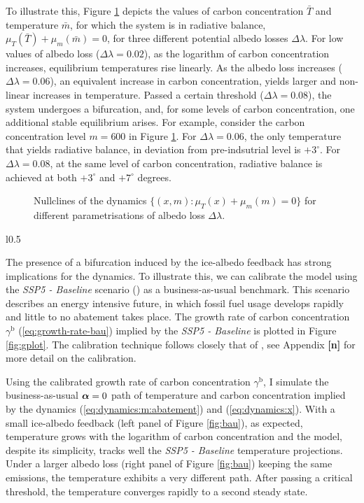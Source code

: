 \documentclass[../../main.tex]{subfiles}
\begin{document}
To illustrate this, Figure \ref{fig:nullclines} depicts the values of carbon concentration $\bar{T}$ and temperature $\bar m$, for which the system is in radiative balance, $\mu_T(\bar{T}) + \mu_m(\bar{m}) = 0$, for three different potential albedo losses $\Delta \lambda$. For low values of albedo loss ($\Delta \lambda = 0.02$), as the logarithm of carbon concentration increases, equilibrium temperatures rise linearly. As the albedo loss increases ($\Delta \lambda = 0.06$), an equivalent increase in carbon concentration, yields larger and non-linear increases in temperature. Passed a certain threshold ($\Delta \lambda = 0.08$), the system undergoes a bifurcation, and, for some levels of carbon concentration, one additional stable equilibrium arises. For example, consider the carbon concentration level $m = 600$ in Figure \ref{fig:nullclines}. For $\Delta \lambda = 0.06$, the only temperature that yields radiative balance, in deviation from pre-indsutrial level is $+3^\circ$. For $\Delta \lambda = 0.08$, at the same level of carbon concentration, radiative balance is achieved at both $+3^\circ$ and $+7^\circ$ degrees. 

\begin{figure}[H]
    \centering
    \caption{Nullclines of the dynamics $\{(x, m): \mu_T( x) + \mu_m(m) = 0\}$ for different parametrisations of albedo loss $\Delta \lambda$.}
    \label{fig:nullclines}
\end{figure}

\begin{wrapfigure}{l}{0.5\textwidth}
    \caption{}
    \label{fig:gplot}
\end{wrapfigure}
The presence of a bifurcation induced by the ice-albedo feedback has strong implications for the dynamics. To illustrate this, we can calibrate the model using the \textit{SSP5 - Baseline} scenario (\cite{kriegler_fossil-fueled_2017}) as a business-as-usual benchmark. This scenario describes an energy intensive future, in which fossil fuel usage develops rapidly and little to no abatement takes place. The growth rate of carbon concentration $\gamma^{\mathrm{b}}$ (\ref{eq:growth-rate-bau}) implied by the \textit{SSP5 - Baseline} is plotted in Figure \ref{fig:gplot}. The calibration technique follows closely that of , see Appendix \textbf{[n]} for more detail on the calibration.

Using the calibrated growth rate of carbon concentration $\gamma^{\mathrm{b}}$, I simulate the business-as-usual $\bm{\alpha} = 0$ path of temperature and carbon concentration implied by the dynamics (\ref{eq:dynamics:m:abatement}) and (\ref{eq:dynamics:x}). With a small ice-albedo feedback (left panel of Figure \ref{fig:bau}), as expected, temperature grows with the logarithm of carbon concentration and the model, despite its simplicity, tracks well the \textit{SSP5 - Baseline} temperature projections. Under a larger albedo loss (right panel of Figure \ref{fig:bau}) keeping the same emissions, the temperature exhibits a very different path. After passing a critical threshold, the temperature converges rapidly to a second steady state.
\end{document}
